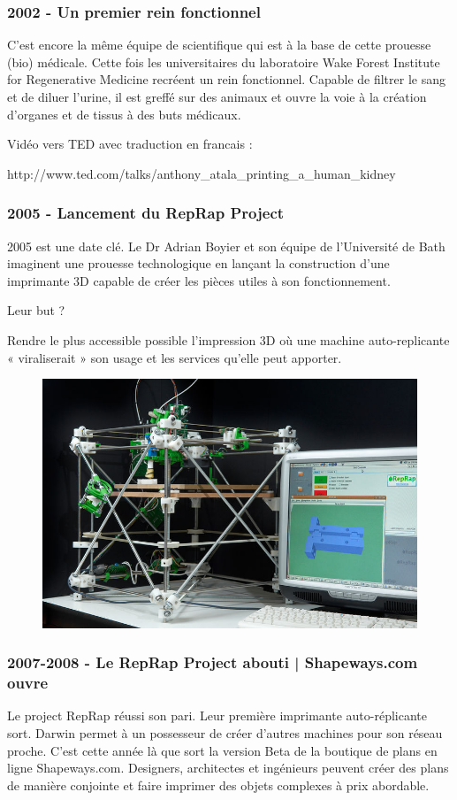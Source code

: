 \documentclass{article}
\begin{document}
\subsubsection{2002 - Un premier rein fonctionnel}
C'est encore la même équipe de scientifique qui est à la base de cette prouesse (bio) médicale. Cette fois les universitaires du laboratoire Wake Forest Institute for Regenerative Medicine recréent un rein fonctionnel. Capable de filtrer le sang et de diluer l'urine, il est greffé sur des animaux et ouvre la voie à la création d'organes et de tissus à des buts médicaux.

Vidéo vers TED avec traduction en francais :

http://www.ted.com/talks/anthony\_atala\_printing\_a\_human\_kidney

\subsubsection{2005 - Lancement du RepRap Project}
2005 est une date clé. Le Dr Adrian Boyier et son équipe de l'Université de Bath imaginent une prouesse technologique en lançant la construction d'une imprimante 3D capable de créer les pièces utiles à son fonctionnement. 

Leur but ?

Rendre le plus accessible possible l'impression 3D où une machine auto-replicante « viraliserait » son usage et les services qu'elle peut apporter.
\begin{figure}[h!]
\centering
\includegraphics[scale=0.25]{./images/Darwin.png}
\end{figure}
\subsubsection{2007-2008 - Le RepRap Project abouti | Shapeways.com ouvre}
Le project RepRap réussi son pari. Leur première imprimante auto-réplicante sort. Darwin permet à un possesseur de créer d'autres machines pour son réseau proche.
C'est cette année là que sort la version Beta de la boutique de plans en ligne Shapeways.com.
Designers, architectes et ingénieurs peuvent créer des plans de manière conjointe et faire imprimer des objets complexes à prix abordable.
\end{document}
